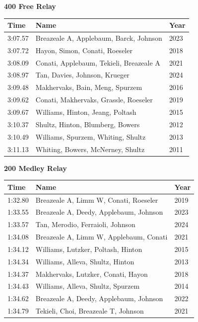 \noindent\begin{minipage}[t]{0.98\textwidth}
\centering
\textbf{\textcolor{teamprimary}{400 Free Relay}}\par
\vspace{0.5em}
\centering
\small
\renewcommand{\arraystretch}{1.0}
\setlength{\tabcolsep}{4pt}
\begin{tabular}{@{}p{4.5cm}p{8.5cm}p{2.5cm}@{}}
\toprule
\textbf{Time} & \textbf{Name} & \textbf{Year} \\
\midrule
3:07.57 & Breazeale A, Applebaum, Barck, Johnson & 2023 \\
3:07.72 & Hayon, Simon, Conati, Roeseler & 2018 \\
3:08.09 & Conati, Applebaum, Tekieli, Breazeale A & 2021 \\
3:08.97 & Tan, Davies, Johnson, Krueger & 2024 \\
3:09.48 & Makhervaks, Bain, Meng, Spurzem & 2016 \\
3:09.62 & Conati, Makhervaks, Grassle, Roeseler & 2019 \\
3:09.67 & Williams, Hinton, Jeang, Poltash & 2015 \\
3:10.37 & Shultz, Hinton, Blumberg, Bowers & 2012 \\
3:10.49 & Williams, Spurzem, Whiting, Shultz & 2013 \\
3:11.13 & Whiting, Bowers, McNerney, Shultz & 2011 \\
\bottomrule
\end{tabular}
\end{minipage}
\vspace{1.2em}
\noindent\begin{minipage}[t]{0.98\textwidth}
\centering
\textbf{\textcolor{teamprimary}{200 Medley Relay}}\par
\vspace{0.5em}
\centering
\small
\renewcommand{\arraystretch}{1.0}
\setlength{\tabcolsep}{4pt}
\begin{tabular}{@{}p{4.5cm}p{8.5cm}p{2.5cm}@{}}
\toprule
\textbf{Time} & \textbf{Name} & \textbf{Year} \\
\midrule
1:32.80 & Breazeale A, Limm W, Conati, Roeseler & 2019 \\
1:33.55 & Breazeale A, Deedy, Applebaum, Johnson & 2023 \\
1:33.57 & Tan, Merodio, Ferraioli, Johnson & 2024 \\
1:34.08 & Breazeale A, Limm W, Applebaum, Conati & 2021 \\
1:34.12 & Williams, Lutzker, Poltash, Hinton & 2015 \\
1:34.34 & Williams, Alleva, Shultz, Hinton & 2013 \\
1:34.37 & Makhervaks, Lutzker, Conati, Hayon & 2018 \\
1:34.43 & Williams, Alleva, Shultz, Spurzem & 2014 \\
1:34.62 & Breazeale A, Deedy, Applebaum, Johnson & 2022 \\
1:34.79 & Tekieli, Choi, Breazeale T, Johnson & 2021 \\
\bottomrule
\end{tabular}
\end{minipage}
\vspace{-0.5em}
\clearpage
